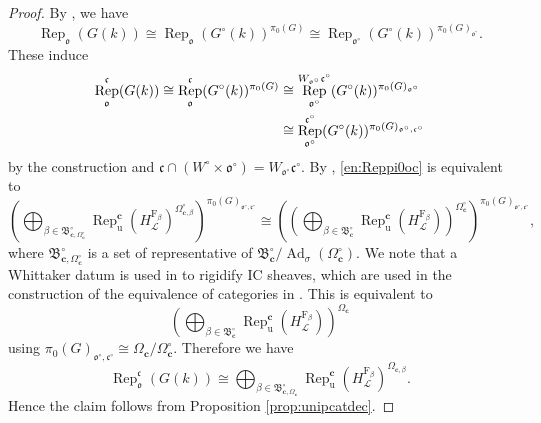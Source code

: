 \documentclass[12pt,a4paper]{article}
\DeclareMathOperator{\Rep}{Rep}
\DeclareMathOperator{\Ad}{Ad}
\newcommand{\mc}{\mathcal}
\newcommand{\mr}{\mathrm}
\newcommand{\mf}{\mathfrak}
\newcommand{\mbf}{\mathbf}
\begin{document}
\begin{proof}
	By \cite[(3.3),(3.4)]{SolEnddisfin}, 
	we have 
	\begin{equation*}
		\Rep_{\mf{o}} (G(k)) \cong \Rep_{\mf{o}} (G^{\circ}(k))^{\pi_0 (G)} \cong  \Rep_{\mf{o}^{\circ}} (G^{\circ}(k))^{\pi_0 (G)_{\mf{o}^{\circ}}} . 
	\end{equation*}
	These induce 
	\begin{align}
		\Rep_{\mf{o}}^{\mf{c}} (G(k)) \cong \Rep_{\mf{o}}^{\mf{c}} (G^{\circ}(k))^{\pi_0 (G)} 
		&\cong 
		\Rep_{\mf{o}^{\circ}}^{W_{\mf{o}^{\circ}} \mf{c}^{\circ}} (G^{\circ}(k))^{\pi_0 (G)_{\mf{o}^{\circ}}} \notag \\ 
		&\cong 
		\Rep_{\mf{o}^{\circ}}^{\mf{c}^{\circ}} (G^{\circ}(k))^{\pi_0 (G)_{\mf{o}^{\circ},\mf{c}^{\circ}}} \label{en:Reppi0oc} 
	\end{align}
	by the construction and $\mf{c} \cap (W^{\circ} \times \mf{o}^{\circ})= W_{\mf{o}^{\circ}} \mf{c}^{\circ}$. 
By \cite[12.7 Corollary]{LuYuEndHecchv3}, 
	\eqref{en:Reppi0oc} is equivalent to 
	\begin{equation*}
		\left( \bigoplus_{\beta \in \mf{B}_{\mbf{c},\Omega_{\mbf{c}}^{\circ}}^{\circ}} \Rep_{\mr{u}}^{\mbf{c}}(H_{\mc{L}}^{\mr{F}_{\beta}})^{\Omega_{\mbf{c},\beta}^{\circ}} \right)^{\pi_0 (G)_{\mf{o}^{\circ},\mf{c}^{\circ}}} 
		\cong 
		\left( \left( \bigoplus_{\beta \in \mf{B}_{\mbf{c}}^{\circ}} \Rep_{\mr{u}}^{\mbf{c}}(H_{\mc{L}}^{\mr{F}_{\beta}}) \right)^{\Omega_{\mbf{c}}^{\circ}} \right)^{\pi_0 (G)_{\mf{o}^{\circ},\mf{c}^{\circ}}} , 
	\end{equation*}
	where $\mf{B}_{\mbf{c},\Omega_{\mbf{c}}^{\circ}}^{\circ}$ is a set of representative of 
	$\mf{B}_{\mbf{c}}^{\circ}/\Ad_{\sigma}(\Omega_{\mbf{c}}^{\circ})$. 
	We note that a Whittaker datum is used in \cite[5.11]{LuYuEndHecchv3} to rigidify IC sheaves, which are used in the construction of the equivalence of categories in \cite[12.7 Corollary]{LuYuEndHecchv3}. 
	This is equivalent to 
	\begin{equation*}
		\left( \bigoplus_{\beta \in \mf{B}_{\mbf{c}}^{\circ}} \Rep_{\mr{u}}^{\mbf{c}}(H_{\mc{L}}^{\mr{F}_{\beta}}) \right)^{\Omega_{\mbf{c}}}  
	\end{equation*}
	using $\pi_0 (G)_{\mf{o}^{\circ},\mf{c}^{\circ}} \cong \Omega_{\mbf{c}}/\Omega_{\mbf{c}}^{\circ}$. 
	Therefore we have  
	\begin{equation*}
		\Rep_{\mf{o}}^{\mf{c}} (G(k)) \cong \bigoplus_{\beta \in \mf{B}_{\mbf{c},\Omega_{\mbf{c}}}^{\circ}} \Rep_{\mr{u}}^{\mbf{c}}(H_{\mc{L}}^{\mr{F}_{\beta}})^{\Omega_{\mbf{c},\beta}} .
	\end{equation*}
	Hence the claim follows from Proposition \ref{prop:unipcatdec}. 
\end{proof}
\end{document}
